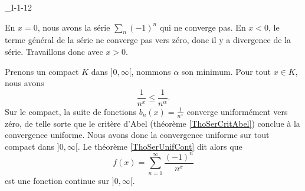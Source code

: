 

\begin{corrige}{_I-1-12}

En $x=0$, nous avons la série $\sum_n (-1)^n$ qui ne converge pas. En $x<0$, le terme général de la série ne converge pas vers zéro, donc il y a divergence de la série. Travaillons donc avec $x>0$.

Prenons un compact $K$ dans $]0,\infty[$, nommons $\alpha$ son minimum. Pour tout $x\in K$, nous avons
\begin{equation}
	\frac{ 1 }{ n^x }\leq\frac{1}{ n^{\alpha} }.
\end{equation}
Sur le compact, la suite de fonctions $b_n(x)=\frac{1}{ n^x }$ converge uniformément vers zéro, de telle sorte que le critère d'Abel (théorème \ref{ThoSerCritAbel}) conclue à la convergence uniforme. Nous avons donc la convergence uniforme sur tout compact dans $]0,\infty[$. Le théorème \ref{ThoSerUnifCont} dit alors que 
\begin{equation}
	f(x)=\sum_{n=1}^{\infty}\frac{ (-1)^n }{ n^x }
\end{equation}
est une fonction continue sur $]0,\infty[$.

\end{corrige}
